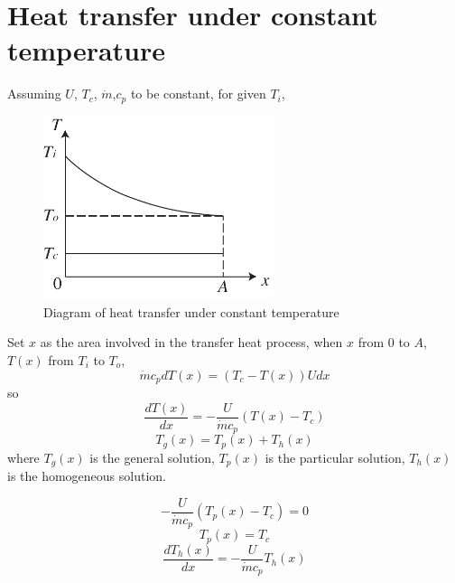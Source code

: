 \appendix

\renewcommand{\theequation}{\Alph{chapter}-\arabic{equation}}
\renewcommand{\thefigure}{\Alph{chapter}-\arabic{figure}}

\chapter{Heat transfer under constant temperature}
\label{cha:CTHX}
Assuming $U$, $T_{c}$, $\dot{m}$,$c_{p}$ to be constant, for given $T_{i}$,

\begin{figure}[h]
\centering
\includegraphics[width=0.6\textwidth]{fig/ConstTempHX.pdf}
\caption{Diagram of heat transfer under constant temperature}
\label{fig:CTHX}
\end{figure}
 
Set $x$ as the area involved in the transfer heat process, when $x$ from $0$ to $A$, $T(x)$ from $T_{i}$ to $T_{o}$,
\begin{equation}
\dot{m}c_{p}dT(x)=(T_{c}-T(x))Udx
\end{equation}
so
\begin{equation}
\frac{dT(x)}{dx}=-\frac{U}{\dot{m}c_{p}}(T(x)-T_{c})
\end{equation}
\begin{equation}
T_{g}(x)=T_{p}(x)+T_{h}(x)
\end{equation}
where $T_{g}(x)$ is the general solution, $T_{p}(x)$ is the particular
solution, $T_{h}(x)$ is the homogeneous solution.

\begin{equation}
-\frac{U}{\dot{m}c_{p}}(T_{p}(x)-T_{c})=0
\end{equation}
\begin{equation}
T_{p}(x)=T_{c}
\end{equation}
\begin{equation}
\frac{dT_{h}(x)}{dx}=-\frac{U}{\dot{m}c_{p}}T_{h}(x)
\label{eq:T_h(x)}
\end{equation}

